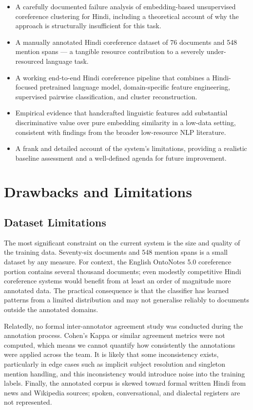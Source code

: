 \documentclass[12pt,a4paper]{report}
\begin{document}
\begin{itemize}
    \item A carefully documented failure analysis of embedding-based unsupervised coreference clustering for Hindi, including a theoretical account of why the approach is structurally insufficient for this task.
    \item A manually annotated Hindi coreference dataset of 76 documents and 548 mention spans --- a tangible resource contribution to a severely under-resourced language task.
    \item A working end-to-end Hindi coreference pipeline that combines a Hindi-focused pretrained language model, domain-specific feature engineering, supervised pairwise classification, and cluster reconstruction.
    \item Empirical evidence that handcrafted linguistic features add substantial discriminative value over pure embedding similarity in a low-data setting, consistent with findings from the broader low-resource NLP literature.
    \item A frank and detailed account of the system's limitations, providing a realistic baseline assessment and a well-defined agenda for future improvement.
\end{itemize}

\section{Drawbacks and Limitations}

\subsection{Dataset Limitations}

The most significant constraint on the current system is the size and quality of the training data. Seventy-six documents and 548 mention spans is a small dataset by any measure. For context, the English OntoNotes 5.0 coreference portion contains several thousand documents; even modestly competitive Hindi coreference systems would benefit from at least an order of magnitude more annotated data. The practical consequence is that the classifier has learned patterns from a limited distribution and may not generalise reliably to documents outside the annotated domains.

Relatedly, no formal inter-annotator agreement study was conducted during the annotation process. Cohen's Kappa or similar agreement metrics were not computed, which means we cannot quantify how consistently the annotations were applied across the team. It is likely that some inconsistency exists, particularly in edge cases such as implicit subject resolution and singleton mention handling, and this inconsistency would introduce noise into the training labels. Finally, the annotated corpus is skewed toward formal written Hindi from news and Wikipedia sources; spoken, conversational, and dialectal registers are not represented.
\end{document}
